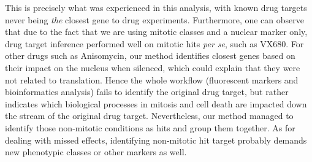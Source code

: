 This is precisely what was experienced in this analysis, with known drug targets never being \textit{the} closest gene to drug experiments. Furthermore, one can observe that due to the fact that we are using mitotic classes and a nuclear marker only, drug target inference performed well on mitotic hits \textit{per se}, such as VX680. For other drugs such as Anisomycin, our method identifies closest genes based on their impact on the nucleus when silenced, which could explain that they were not related to translation. Hence the whole workflow (fluorescent markers and bioinformatics analysis) fails to identify the original drug target, but rather indicates which biological processes in mitosis and cell death are impacted down the stream of the original drug target. Nevertheless, our method managed to identify those non-mitotic conditions as hits and group them together. As for dealing with missed effects, identifying non-mitotic hit target probably demands new phenotypic classes or other markers as well. 
